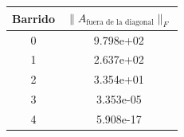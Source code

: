 \begin{tabular}{c c}
\toprule
 Barrido & $\lVert A_{\text{fuera de la diagonal}}\rVert_F$\\
\midrule
0 & 9.798e+02\\
1 & 2.637e+02\\
2 & 3.354e+01\\
3 & 3.353e-05\\
4 & 5.908e-17\\
\bottomrule
\end{tabular}
